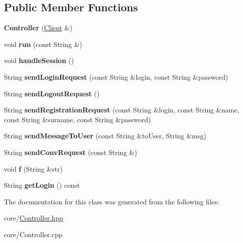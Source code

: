 \subsection*{Public Member Functions}
\begin{DoxyCompactItemize}
\item 
{\bfseries Controller} (\hyperlink{classClient}{Client} \&)\hypertarget{classController_abdfa33e6687675dbcece03f3b71f7ad0}{}\label{classController_abdfa33e6687675dbcece03f3b71f7ad0}

\item 
void {\bfseries run} (const String \&)\hypertarget{classController_a8dc70c84e6d5c77b6801073f17a09c9f}{}\label{classController_a8dc70c84e6d5c77b6801073f17a09c9f}

\item 
void {\bfseries handle\+Session} ()\hypertarget{classController_a55b91f599170dc6e7b0dc01c6560c474}{}\label{classController_a55b91f599170dc6e7b0dc01c6560c474}

\item 
String {\bfseries send\+Login\+Request} (const String \&login, const String \&password)\hypertarget{classController_a554f7fefaf160170986f4b916aeb4ffd}{}\label{classController_a554f7fefaf160170986f4b916aeb4ffd}

\item 
String {\bfseries send\+Logout\+Request} ()\hypertarget{classController_a6919677cbe8e89171c99544860c07ce6}{}\label{classController_a6919677cbe8e89171c99544860c07ce6}

\item 
String {\bfseries send\+Registration\+Request} (const String \&login, const String \&name, const String \&surname, const String \&password)\hypertarget{classController_a1b3e4b042a20b1f94010eb6625e3ac20}{}\label{classController_a1b3e4b042a20b1f94010eb6625e3ac20}

\item 
String {\bfseries send\+Message\+To\+User} (const String \&to\+User, String \&msg)\hypertarget{classController_a3663c7529e007675c1e94ead6d5aafc9}{}\label{classController_a3663c7529e007675c1e94ead6d5aafc9}

\item 
String {\bfseries send\+Conv\+Request} (const String \&)\hypertarget{classController_a774bfb89454e8ae116c1ba51395d6392}{}\label{classController_a774bfb89454e8ae116c1ba51395d6392}

\item 
void {\bfseries f} (String \&str)\hypertarget{classController_a95e98a70661457e6d3d08a0985ebe72d}{}\label{classController_a95e98a70661457e6d3d08a0985ebe72d}

\item 
String {\bfseries get\+Login} () const \hypertarget{classController_aad5de5df0deb5c552c0b6c57acabee26}{}\label{classController_aad5de5df0deb5c552c0b6c57acabee26}

\end{DoxyCompactItemize}


The documentation for this class was generated from the following files\+:\begin{DoxyCompactItemize}
\item 
core/\hyperlink{Controller_8hpp}{Controller.\+hpp}\item 
core/Controller.\+cpp\end{DoxyCompactItemize}
